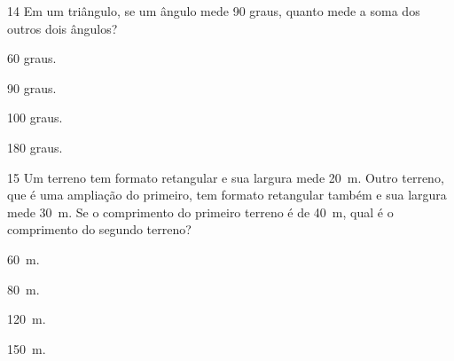 
\num{14} Em um triângulo, se um ângulo mede 90 graus, quanto mede a soma dos
outros dois ângulos?

\begin{multicols}{2}
\begin{escolha}
\item 60 graus.
\item 90 graus.
\item 100 graus.
\item 180 graus.
\end{escolha}
\end{multicols}







\num{15} Um terreno tem formato retangular e sua largura mede 20~m. Outro
terreno, que é uma ampliação do primeiro, tem formato retangular também
e sua largura mede 30~m. Se o comprimento do primeiro terreno é de 40~m,
qual é o comprimento do segundo terreno?

\begin{multicols}{2}
\begin{escolha}
\item 60~m.
\item 80~m.
\item 120~m.
\item 150~m.
\end{escolha}
\end{multicols}




